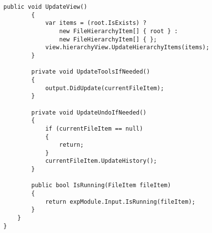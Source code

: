 \documentclass{scrartcl}
\begin{document}
\begin{lstlisting}[language={[Sharp]C}, caption={IDE}, label={experiment}]
        public void UpdateView()
        {
            var items = (root.IsExists) ?
                new FileHierarchyItem[] { root } :
                new FileHierarchyItem[] { };
            view.hierarchyView.UpdateHierarchyItems(items);
        }

        private void UpdateToolsIfNeeded()
        {
            output.DidUpdate(currentFileItem);
        }

        private void UpdateUndoIfNeeded()
        {
            if (currentFileItem == null)
            {
                return;
            }
            currentFileItem.UpdateHistory();
        }

        public bool IsRunning(FileItem fileItem)
        {
            return expModule.Input.IsRunning(fileItem);
        }
    }
}


\end{lstlisting}
\end{document}
